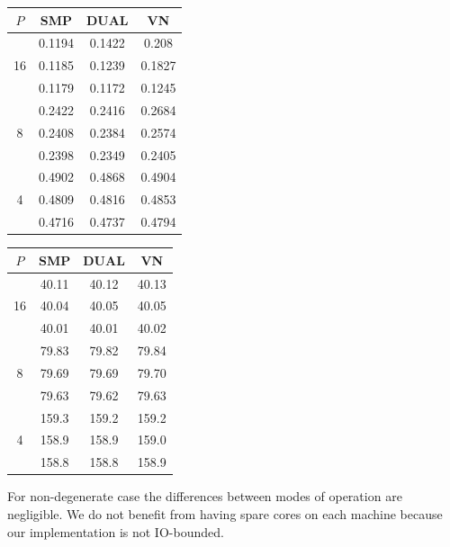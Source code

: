 \begin{minipage}[h]{0.47\textwidth}
\centering
\begin{tabular}{c|c|c|c|}
$P$ & SMP & DUAL & VN \\
\hline
 & 0.1194 & 0.1422 & 0.208 \\
16 & 0.1185 & 0.1239 & 0.1827 \\
 & 0.1179 & 0.1172 & 0.1245 \\
\hline
 & 0.2422 & 0.2416 & 0.2684 \\
8 & 0.2408 & 0.2384 & 0.2574 \\
 & 0.2398 & 0.2349 & 0.2405 \\
\hline
 & 0.4902 & 0.4868 & 0.4904 \\
4 & 0.4809 & 0.4816 & 0.4853 \\
 & 0.4716 & 0.4737 & 0.4794 \\
\hline
\end{tabular}
\end{minipage}
\hfill
\begin{minipage}[h]{0.47\textwidth}
\centering
\begin{tabular}{c|c|c|c|}
$P$ & SMP & DUAL & VN \\
\hline
 & 40.11 & 40.12 & 40.13 \\
16 & 40.04 & 40.05 & 40.05 \\
 & 40.01 & 40.01 & 40.02 \\
\hline
 & 79.83 & 79.82 & 79.84 \\
8 & 79.69 & 79.69 & 79.70 \\
 & 79.63 & 79.62 & 79.63 \\
\hline
 & 159.3 & 159.2 & 159.2 \\
4 & 158.9 & 158.9 & 159.0 \\
 & 158.8 & 158.8 & 158.9 \\
\hline
\end{tabular}
\end{minipage}
\vspace{1em}

For non-degenerate case the differences between modes of operation are negligible.
We do not benefit from having spare cores on each machine because our implementation is not IO-bounded.

